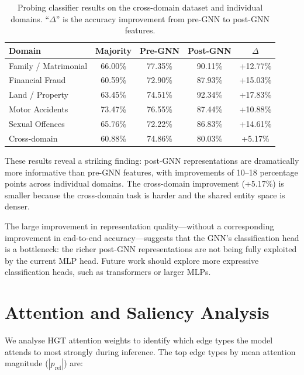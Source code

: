\documentclass[12pt,a4paper]{report}
\begin{document}
\begin{table}[H]
  \centering
  \caption{Probing classifier results on the cross-domain dataset and individual domains. ``$\Delta$'' is the accuracy improvement from pre-GNN to post-GNN features.}
  \label{tab:probing}
  \begin{tabular}{lcccc}
    \toprule
    \textbf{Domain} & \textbf{Majority} & \textbf{Pre-GNN} & \textbf{Post-GNN} & \textbf{$\Delta$} \\
    \midrule
    Family / Matrimonial & 66.00\% & 77.35\% & 90.11\% & +12.77\% \\
    Financial Fraud & 60.59\% & 72.90\% & 87.93\% & +15.03\% \\
    Land / Property & 63.45\% & 74.51\% & 92.34\% & +17.83\% \\
    Motor Accidents & 73.47\% & 76.55\% & 87.44\% & +10.88\% \\
    Sexual Offences & 65.76\% & 72.22\% & 86.83\% & +14.61\% \\
    Cross-domain & 60.88\% & 74.86\% & 80.03\% & +5.17\% \\
    \bottomrule
  \end{tabular}
\end{table}

These results reveal a striking finding: post-GNN representations are dramatically more informative than pre-GNN features, with improvements of 10--18 percentage points across individual domains. The cross-domain improvement (+5.17\%) is smaller because the cross-domain task is harder and the shared entity space is denser.

The large improvement in representation quality---without a corresponding improvement in end-to-end accuracy---suggests that the GNN's classification head is a bottleneck: the richer post-GNN representations are not being fully exploited by the current MLP head. Future work should explore more expressive classification heads, such as transformers or larger MLPs.

\section{Attention and Saliency Analysis}
\label{sec:attention}

We analyse HGT attention weights to identify which edge types the model attends to most strongly during inference. The top edge types by mean attention magnitude ($|p_\text{rel}|$) are:
\end{document}
